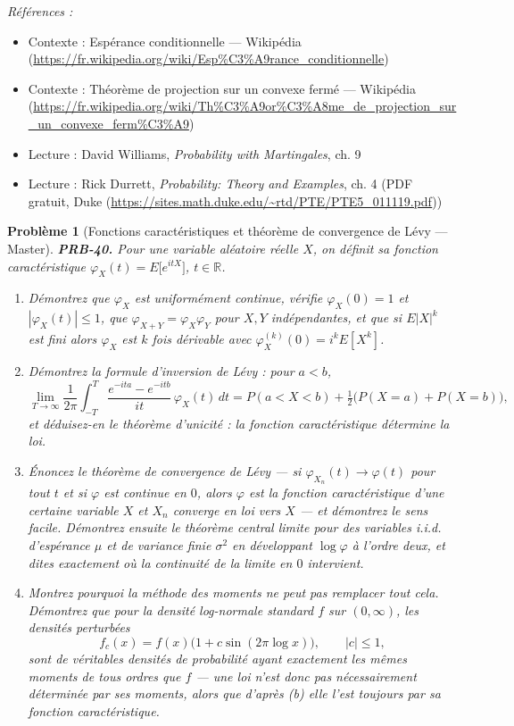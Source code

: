 \documentclass[11pt]{article}
\newtheorem{problem}{Problème}
\newenvironment{refs}{\par\small\noindent\emph{Références :}\begin{itemize}\setlength\itemsep{0pt}}{\end{itemize}\normalsize}
\begin{document}
\begin{refs}
\item Contexte : Espérance conditionnelle --- Wikipédia (\url{https://fr.wikipedia.org/wiki/Esp%C3%A9rance_conditionnelle})
\item Contexte : Théorème de projection sur un convexe fermé --- Wikipédia (\url{https://fr.wikipedia.org/wiki/Th%C3%A9or%C3%A8me_de_projection_sur_un_convexe_ferm%C3%A9})
\item Lecture : David Williams, \textit{Probability with Martingales}, ch. 9
\item Lecture : Rick Durrett, \textit{Probability: Theory and Examples}, ch. 4 (PDF gratuit, Duke (\url{https://sites.math.duke.edu/~rtd/PTE/PTE5_011119.pdf}))
\end{refs}

\bigskip

\begin{problem}[{Fonctions caractéristiques et théorème de convergence de Lévy --- Master}]
\textbf{PRB-40.} Pour une variable aléatoire réelle $ X $, on définit sa fonction
caractéristique $ \varphi_X(t) = E\big[e^{itX}\big] $, $ t \in \mathbb{R} $.
\begin{enumerate}
\item[(a)] Démontrez que $ \varphi_X $ est uniformément continue, vérifie $ \varphi_X(0) = 1 $ et
$ |\varphi_X(t)| \le 1 $, que $ \varphi_{X+Y} = \varphi_X \varphi_Y $ pour $ X, Y $
indépendantes, et que si $ E|X|^k $ est fini alors $ \varphi_X $ est $ k $ fois dérivable
avec $ \varphi_X^{(k)}(0) = i^k E[X^k] $.
\item[(b)] Démontrez la formule d'inversion de Lévy : pour $ a < b $,
\[ \lim_{T \to \infty} \frac{1}{2\pi} \int_{-T}^{T}
 \frac{e^{-ita} - e^{-itb}}{it}\, \varphi_X(t)\, dt
 = P(a < X < b) + \tfrac{1}{2}\big( P(X = a) + P(X = b) \big) , \]
et déduisez-en le théorème d'unicité : la fonction caractéristique détermine la loi.
\item[(c)] Énoncez le théorème de convergence de Lévy --- si $ \varphi_{X_n}(t) \to \varphi(t) $ pour tout
$ t $ et si $ \varphi $ est continue en $ 0 $, alors $ \varphi $ est la fonction
caractéristique d'une certaine variable $ X $ et $ X_n $ converge en loi vers $ X $ --- et
démontrez le sens facile. Démontrez ensuite le théorème central limite pour des variables i.i.d.
d'espérance $ \mu $ et de variance finie $ \sigma^2 $ en développant $ \log \varphi $ à
l'ordre deux, et dites exactement où la continuité de la limite en $ 0 $ intervient.
\item[(d)] Montrez pourquoi la méthode des moments ne peut pas remplacer tout cela. Démontrez que pour la
densité log-normale standard $ f $ sur $ (0,\infty) $, les densités perturbées
\[ f_c(x) = f(x)\big( 1 + c \sin(2\pi \log x) \big), \qquad |c| \le 1 , \]
sont de véritables densités de probabilité ayant exactement les mêmes moments de tous ordres que
$ f $ --- une loi n'est donc pas nécessairement déterminée par ses moments, alors que d'après (b)
elle l'est toujours par sa fonction caractéristique.
\end{enumerate}

\end{problem}
\end{document}
